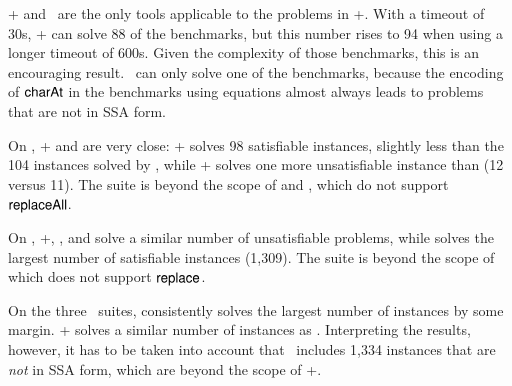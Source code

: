 

{\ostrich}+ and \ostrich\ are the only tools applicable to the
problems in {\transducerbench}+. With a timeout of 30s, \ostrich+ can
solve 88 of the benchmarks, but this number rises to 94 when using a
longer timeout of 600s. Given the complexity of those benchmarks, this
is an encouraging result. \ostrich\ can only solve one of the
benchmarks, because the encoding of $\mathsf{charAt}$ in the benchmarks using
equations almost always leads to problems that are not in SSA form.

On {\slogbenchra}, {\ostrich}+ and {\cvc} are very close: {\ostrich}+ solves 98 satisfiable instances, slightly less than the 104 instances solved by {\cvc}, while {\ostrich}+ solves one more unsatisfiable instance than {\cvc} (12 versus 11). The suite is beyond the scope of {\zthree} and {\zthreetrau}, which do not support $\mathsf{replaceAll}$.

On {\slogbenchr}, {\ostrich}+, {\cvc}, and {\zthree} solve a similar
number of unsatisfiable problems, while {\cvc} solves the largest
number of satisfiable instances (1,309). The  suite %
is beyond the scope of {\zthreetrau} which does not support
$\mathsf{replace}$.

On the three \pyexbench\ suites, {\zthreetrau} consistently solves the
largest number of instances by some margin. \ostrich+ solves a similar
number of instances as \zthree. Interpreting the results, however, it
has to be taken into account that \pyexbench\  includes 1,334  instances
that are \emph{not} in SSA form, which are beyond the scope of
\ostrich+.

